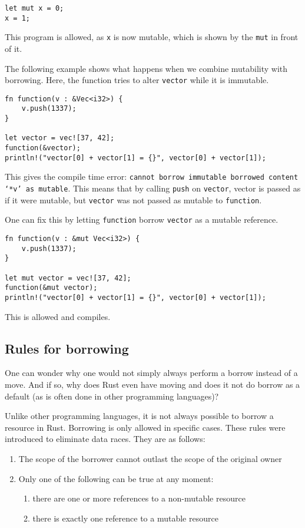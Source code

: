 \begin{verbatim}
let mut x = 0;
x = 1;
\end{verbatim}
This program is allowed, as \verb|x| is now mutable, which is shown by the \verb|mut| in front of it. 

The following example shows what happens when we combine mutability with borrowing. Here, the function tries to alter \verb|vector| while it is immutable. 

\begin{verbatim}
fn function(v : &Vec<i32>) {
    v.push(1337);
}

let vector = vec![37, 42];
function(&vector);
println!("vector[0] + vector[1] = {}", vector[0] + vector[1]);
\end{verbatim}

This gives the compile time error: \texttt{cannot borrow immutable borrowed content `*v' as mutable}. This means that by calling \verb|push| on \verb|vector|, vector is passed as if it were mutable, but \verb|vector| was not passed as mutable to \verb|function|. 

One can fix this by letting \verb|function| borrow \verb|vector| as a mutable reference. 

\begin{verbatim}
fn function(v : &mut Vec<i32>) {
    v.push(1337);
}

let mut vector = vec![37, 42];
function(&mut vector);
println!("vector[0] + vector[1] = {}", vector[0] + vector[1]);
\end{verbatim}

This is allowed and compiles. 

\subsection{Rules for borrowing}
One can wonder why one would not simply always perform a borrow instead of a move. And if so, why does Rust even have moving and does it not do borrow as a default (as is often done in other programming languages)? 

Unlike other programming languages, it is not always possible to borrow a resource in Rust. Borrowing is only allowed in specific cases. These rules were introduced to eliminate data races. They are as follows:
\begin{enumerate}[noitemsep]
    \item The scope of the borrower cannot outlast the scope of the original owner
\item Only one of the following can be true at any moment:
    \begin{enumerate}[noitemsep]
        \item there are one or more references to a non-mutable resource
        \item there is exactly one reference to a mutable resource
    \end{enumerate}
\end{enumerate}

